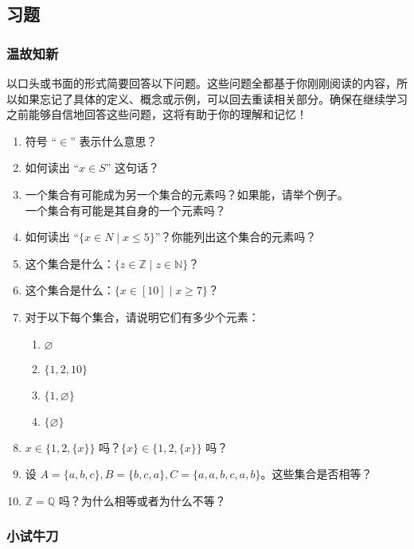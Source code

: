 \subsection{习题}

\subsubsection*{温故知新}

以口头或书面的形式简要回答以下问题。这些问题全都基于你刚刚阅读的内容，所以如果忘记了具体的定义、概念或示例，可以回去重读相关部分。确保在继续学习之前能够自信地回答这些问题，这将有助于你的理解和记忆！

\begin{enumerate}[label=(\arabic*)]
    \item 符号 ``$\in$'' 表示什么意思？
    \item 如何读出 ``$x \in S$'' 这句话？
    \item 一个集合有可能成为另一个集合的元素吗？如果能，请举个例子。\\
    一个集合有可能是其自身的一个元素吗？
    \item 如何读出 ``$\{x \in N \mid x \le 5\}$''？你能列出这个集合的元素吗？
    \item 这个集合是什么：$\{z \in \mathbb{Z} \mid z \in \mathbb{N}\}$？
    \item 这个集合是什么：$\{x \in [10] \mid x \ge 7\}$？
    \item 对于以下每个集合，请说明它们有多少个元素：
        \begin{enumerate}[label=(\alph*)]
            \item $\varnothing$
            \item $\{1, 2, 10\}$
            \item $\{1, \varnothing\}$
            \item $\{\varnothing\}$
        \end{enumerate}
    \item $x \in \{ 1, 2, \{x\} \}$ 吗？$\{x\} \in \{ 1, 2, \{x\} \}$ 吗？
    \item 设 $A = \{a, b, c\}, B = \{b, c, a\}, C = \{a, a, b, c, a, b\}$。这些集合是否相等？
    \item $\mathbb{Z} = \mathbb{Q}$ 吗？为什么相等或者为什么不等？
\end{enumerate}

\subsubsection*{小试牛刀}


